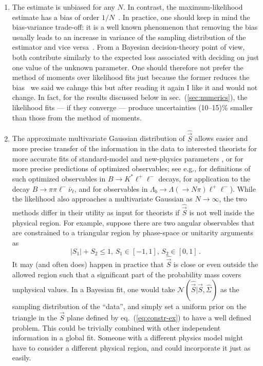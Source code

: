 \documentclass[aps,nofootinbib,preprintnumbers,prd,twocolumn]{revtex4-1}
\newcommand{\refeq}[1]{eq.~(\ref{eq:#1})}
\newcommand{\refsec}[1]{sec.~(\ref{sec:#1})}
\newcommand{\vecest}[1]{\widehat{\vec{#1}}}
\newcommand{\marcin}[1]{{\color{cyan}#1}}
\newcommand{\add}[1]{\textcolor{green!85!black}{#1}}
\begin{document}
\begin{enumerate}
\item The estimate is unbiased for any $N$. In contrast, the
  maximum-likelihood estimate has a bias of order
  $1/N$~\cite{Cox:1968}. In practice, one should keep in mind the
  bias-variance trade-off: it is a well known phenomenon that removing
  the bias usually leads to an increase in variance of the sampling
  distribution of the estimator and vice versa~\cite[sec. 7.3]{James:2006zz}. From a
  Bayesian decision-theory point of view, both contribute similarly to
  the expected loss associated with deciding on just one value of the
  unknown parameter. One should therefore not prefer the method of moments
  over likelihood fits just because the former reduces
  the bias~\cite[sections 13.8,17.2]{jaynes:2003} \marcin{we said we cahnge this but after reading it again I like it and would not change}. In fact, for
  the results discussed below in \refsec{numerics}, the likelihood
  fits --- if they converge --- produce uncertainties (10--15)\%
      smaller than those from the method of moments.
\item The approximate multivariate Gaussian distribution of $\vecest{S}$
    allows easier and more \add{precise} transfer of the information in the
  data to interested theorists for more accurate fits of
  standard-model and new-physics parameters \cite{Altmannshofer:2013foa,
Descotes-Genon:2013wba,Beaujean:2013soa},
  or for more precise predictions of optimized observables; see e.g.,
  \cite{Egede:2008uy,Egede:2010zc,Bobeth:2010wg,Becirevic:2011bp,
    Bobeth:2012vn,Matias:2012xw,DescotesGenon:2012zf} for definitions
  of such optimized observables in $B\to K^*\ell^+\ell^-$ decays,
  \cite{Faller:2013dwa} for application to the decay $B\to
  \pi\pi\ell^-\bar\nu_\ell$, and \cite{Boeer:2014xx} for observables
  in $\Lambda_b\to\Lambda(\to N\pi)\ell^+\ell^-$). While the
  likelihood also approaches a multivariate Gaussian as $N \to
  \infty$, the two methods differ in their utility as input for
  theorists if $\widehat{\vec{S}}$ is not well
  inside the physical region. For example, suppose there are two
  angular observables that are constrained to a triangular region by
  phase-space or unitarity arguments as
  \begin{equation}
    \label{eq:constr-ex}
    |S_1| + S_2 \le 1, \, S_1 \in [-1,1],\, S_2 \in [0,1] \,.
  \end{equation}
  It may (and often does) happen in practice that $\widehat{\vec{S}}$
  is close or even outside the allowed region such that a significant
  part of the probability mass covers unphysical values. In a Bayesian
  fit, one would take $\mathcal{N}(\vecest{S} | \vec{S},
  \widehat{\Sigma})$ as the sampling distribution of the ``data'', and
  simply set a uniform prior on the triangle in the $\vec{S}$ plane
  defined by \refeq{constr-ex} to have a well defined problem. This
  could be trivially combined with other independent information in a
  global fit. Someone with a different physics model might have to
  consider a
  different physical region, and could incorporate it just as easily.\\


\end{enumerate}
\end{document}
